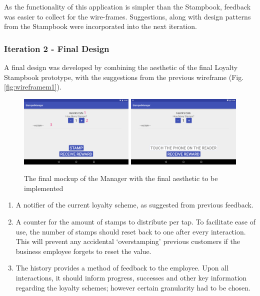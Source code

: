 As the functionality of this application is simpler than the Stampbook, feedback was easier to collect for the wire-frames. Suggestions, along with design patterns from the Stampbook were incorporated into the next iteration.

\subsubsection{Iteration 2 - Final Design}
A final design was developed by combining the aesthetic of the final Loyalty Stampbook prototype, with the suggestions from the previous wireframe  (Fig. \ref{fig:wireframem1}).
\begin{figure}[H]
 \centering
  \includegraphics[width=0.494\textwidth]{img/readerfinalmock2.png}
   \includegraphics[width=0.494\textwidth]{img/readerfinalmock1.png}
     \caption{The final mockup of the Manager with the final aesthetic to be implemented}
     \label{fig:wireframem2}
\end{figure}

\begin{enumerate}
  \item A notifier of the current loyalty scheme, as suggested from previous feedback.
  \item A counter for the amount of stamps to distribute per tap. To facilitate ease of use, the number of stamps should reset back to one after every interaction. This will prevent any accidental `overstamping' previous customers if the business employee forgets to reset the value.
  \item The history provides a method of feedback to the employee. Upon all interactions, it should inform progress, successes and other key information regarding the loyalty schemes; however certain granularity had to be chosen.
\end{enumerate}

